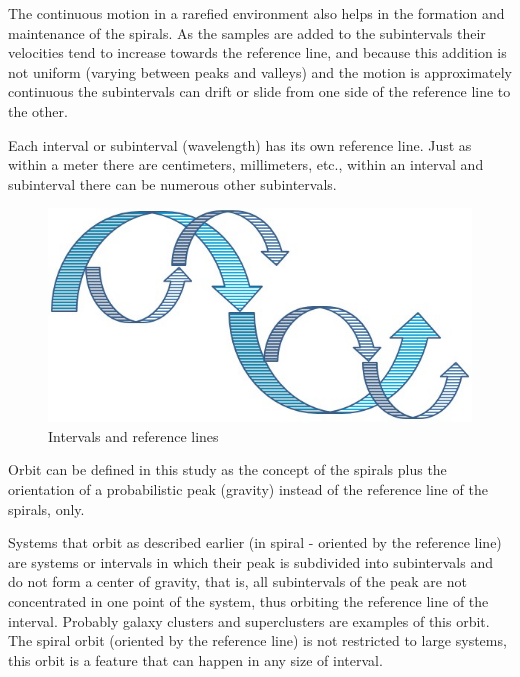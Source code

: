 The continuous motion in a rarefied environment also helps in the formation and maintenance of the spirals. As the samples are added to the subintervals their velocities tend to increase towards the reference line, and because this addition is not uniform (varying between peaks and valleys) and the motion is approximately continuous the subintervals can drift or slide from one side of the reference line to the other.

Each interval or subinterval (wavelength) has its own reference line. Just as within a meter there are centimeters, millimeters, etc., within an interval and subinterval there can be numerous other subintervals.
	\begin{figure}[H]
	\caption{Intervals and reference lines}
	\label{fig:consciousness_space_spiral_underlines}
	\centering
	\includegraphics[scale=.5]{sections/images/consciousness_space_spiral_underlines.jpg}
	\end{figure}

Orbit can be defined in this study as the concept of the spirals plus the orientation of a probabilistic peak (gravity) instead of the reference line of the spirals, only.

Systems that orbit as described earlier (in spiral - oriented by the reference line) are systems or intervals in which their peak is subdivided into subintervals and do not form a center of gravity, that is, all subintervals of the peak are not concentrated in one point of the system, thus orbiting the reference line of the interval. Probably galaxy clusters and superclusters are examples of this orbit. The spiral orbit (oriented by the reference line) is not restricted to large systems, this orbit is a feature that can happen in any size of interval.

